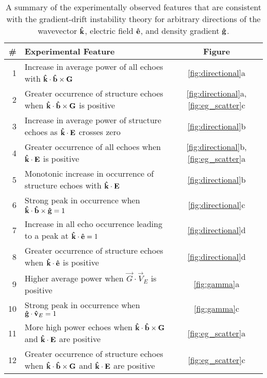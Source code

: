 \begin{table}
\centering
\begin{tabular}{rlc}
	\textbf{\#}& \textbf{Experimental Feature} & \textbf{Figure} \\
	\hline
	1&Increase in average power of all echoes with \(\mathbf{\hat{k}}\cdot\mathbf{\hat{b}}\times\mathbf{G}\) & \ref{fig:directional}a \\
	2&Greater occurrence of structure echoes when \(\mathbf{\hat{k}}\cdot\mathbf{\hat{b}}\times\mathbf{G}\) is positive & \ref{fig:directional}a, \ref{fig:eg_scatter}c \\
	3&Increase in average power of structure echoes as \(\mathbf{\hat{k}}\cdot\mathbf{E}\) crosses zero & \ref{fig:directional}b \\
	4&Greater occurrence of all echoes when \(\mathbf{\hat{k}}\cdot\mathbf{E}\) is positive & \ref{fig:directional}b, \ref{fig:eg_scatter}a \\
	5&Monotonic increase in occurrence of structure echoes with \(\mathbf{\hat{k}}\cdot\mathbf{E}\) & \ref{fig:directional}b \\
	6&Strong peak in occurrence when \(\mathbf{\hat{k}}\cdot\mathbf{\hat{b}}\times\mathbf{\hat{g}} = 1\) & \ref{fig:directional}c \\
	7&Increase in all echo occurrence leading to a peak at \(\mathbf{\hat{k}}\cdot\mathbf{\hat{e}}=1\) & \ref{fig:directional}d \\
	8&Greater occurrence of structure echoes when \(\mathbf{\hat{k}}\cdot\mathbf{\hat{e}}\) is positive & \ref{fig:directional}d \\
	9&Higher average power when \(\vec{G}\cdot\vec{V}_E\) is positive & \ref{fig:gamma}a \\
	10&Strong peak in occurrence when \(\mathbf{\hat{g}}\cdot\mathbf{\hat{v}}_E = 1\) & \ref{fig:gamma}c \\
	11&More high power echoes when \(\mathbf{\hat{k}}\cdot\mathbf{\hat{b}}\times\mathbf{G}\) and \(\mathbf{\hat{k}}\cdot\mathbf{E}\) are positive & \ref{fig:eg_scatter}a \\
	12&Greater occurrence of structure echoes when \(\mathbf{\hat{k}}\cdot\mathbf{\hat{b}}\times\mathbf{G}\) and \(\mathbf{\hat{k}}\cdot\mathbf{E}\) are positive & \ref{fig:eg_scatter}c \\
\end{tabular}
\caption[Results consistent with linear GDI theory]{A summary of the experimentally observed features that are consistent with the gradient-drift instability theory for arbitrary directions of the wavevector \(\mathbf{\hat{k}}\), electric field \(\mathbf{\hat{e}}\), and density gradient \(\mathbf{\hat{g}}\).}
\label{tab:results}
\end{table}


